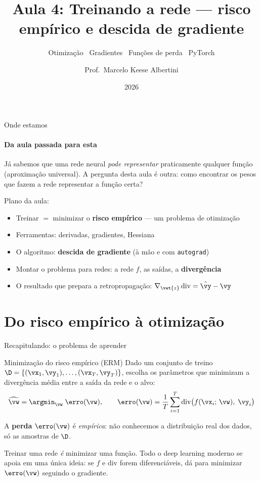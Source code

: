 \documentclass[aspectratio=169, 11pt]{beamer}
\title[Aula 4 — Treinando a rede]{Aula 4: Treinando a rede — risco empírico e descida de gradiente}
\subtitle[GBC073 — Inteligência Computacional]{Otimização \textbullet\ Gradientes \textbullet\ Funções de perda \textbullet\ PyTorch}
\author[Prof.\ Marcelo Albertini]{Prof.\ Marcelo Keese Albertini}
\institute{GBC073 — Inteligência Computacional \textbullet\ Universidade Federal de Uberlândia}
\date{2026}
\begin{document}
\begin{frame}
  \titlepage
\end{frame}

\begin{frame}{Onde estamos}
  \framesubtitle{Da aula passada para esta}

  \begin{ideiabox}
    Já sabemos que uma rede neural \emph{pode representar} praticamente qualquer
    função (aproximação universal). A pergunta desta aula é outra:
    \alert{como encontrar os pesos} que fazem a rede representar a função certa?
  \end{ideiabox}

  \medskip
  Plano da aula:
  \begin{itemize}\setlength{\itemsep}{0.2ex}
    \item Treinar $=$ minimizar o \textbf{risco empírico} — um problema de otimização
    \item Ferramentas: derivadas, gradientes, Hessiana
    \item O algoritmo: \textbf{descida de gradiente} (à mão e com \texttt{autograd})
    \item Montar o problema para redes: a rede $f$, as saídas, a \textbf{divergência}
    \item O resultado que prepara a retropropagação: $\nabla_{\vet{z}}\,\mathrm{div} = \hat{\vy} - \vy$
  \end{itemize}
\end{frame}

\section{Do risco empírico à otimização}

\begin{frame}{Recapitulando: o problema de aprender}
  \begin{defbox}{Minimização do risco empírico (ERM)}
    Dado um conjunto de treino $\D = \{(\vx_1, \vy_1), \dots, (\vx_T, \vy_T)\}$,
    escolha os parâmetros que minimizam a divergência média entre a saída da
    rede e o alvo:
    \[
      \widehat{\vw} = \argmin_{\vw}\; \erro(\vw), \qquad
      \erro(\vw) = \frac{1}{T} \sum_{i=1}^{T}
        \mathrm{div}\big( f(\vx_i;\, \vw),\; \vy_i \big)
    \]
  \end{defbox}

  A \textbf{perda} $\erro(\vw)$ é \emph{empírica}: não conhecemos a
  distribuição real dos dados, só as amostras de $\D$.

  \begin{ideiabox}
    Treinar uma rede \emph{é} minimizar uma função. Todo o deep learning moderno
    se apoia em uma única ideia: se $f$ e $\mathrm{div}$ forem
    \alert{diferenciáveis}, dá para minimizar $\erro(\vw)$ seguindo o gradiente.
  \end{ideiabox}
\end{frame}
\end{document}

